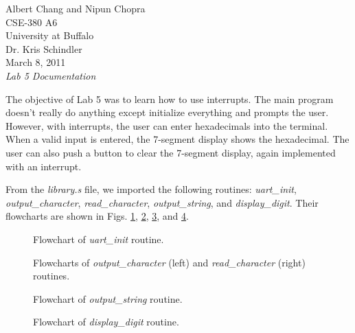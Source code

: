\documentclass[letterpaper,10pt]{article}
\begin{document}
    Albert Chang and Nipun Chopra\\
    CSE-380 A6\\
    University at Buffalo\\
    Dr. Kris Schindler\\
    March 8, 2011\\
    \textit{Lab 5 Documentation}

    The objective of Lab 5 was to learn how to use interrupts. The main program
    doesn't really do anything except initialize everything and prompts the user.
    However, with interrupts, the user can enter hexadecimals into the terminal.
    When a valid input is entered, the 7-segment display shows the hexadecimal.
    The user can also push a button to clear the 7-segment display, again
    implemented with an interrupt.

    From the \textit{library.s} file, we imported the following routines:
    \textit{uart\_init}, \textit{output\_character}, \textit{read\_character},
    \textit{output\_string}, and \textit{display\_digit}. Their flowcharts are
    shown in Figs. \ref{flo:uart_init}, \ref{flo:io_character},
    \ref{flo:output_string}, and \ref{flo:display_digit}.

    \begin{figure}[h]
        
        \caption{Flowchart of \textit{uart\_init} routine.}
        \label{flo:uart_init}
    \end{figure}

    \begin{figure}[h]
        \begin{minipage}{0.5\linewidth}
            
        \end{minipage}%
        \begin{minipage}{0.5\linewidth}
            
        \end{minipage}
        \caption{Flowcharts of \textit{output\_character} (left) and \textit{read\_character} (right) routines.}
        \label{flo:io_character}
    \end{figure}

    \begin{figure}[h]
        
        \caption{Flowchart of \textit{output\_string} routine.}
        \label{flo:output_string}
    \end{figure}

    \begin{figure}[h]
        
        \caption{Flowchart of \textit{display\_digit} routine.}
        \label{flo:display_digit}
    \end{figure}
\end{document}
